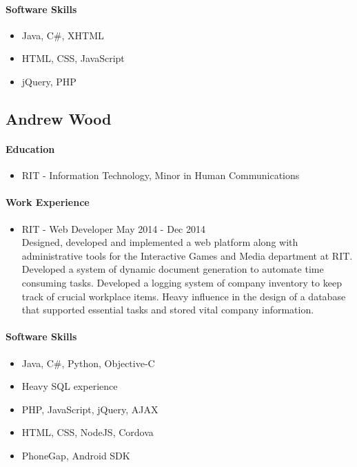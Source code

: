 	\paragraph{Software Skills}
	
		\begin{itemize}
			\item Java, C\#, XHTML
			\item HTML, CSS, JavaScript
			\item jQuery, PHP
		\end{itemize}

\subsection{Andrew Wood}
	\paragraph{Education}
		\begin{itemize}
			\item RIT - Information Technology, Minor in Human Communications
		\end{itemize}
	\paragraph{Work Experience}
		\begin{itemize}
			\item RIT - Web Developer \hfill May 2014 - Dec 2014\\
			Designed, developed and implemented a web platform along with administrative tools for the Interactive Games and Media department at RIT. Developed a system of dynamic document generation to automate time consuming tasks. Developed a logging system of company inventory to keep track of crucial workplace items. Heavy influence in the design of a database that supported essential tasks and stored vital company information.
		\end{itemize}
	\paragraph{Software Skills}
		\begin{itemize}
			\item Java, C\#, Python, Objective-C
			\item Heavy SQL experience
			\item PHP, JavaScript, jQuery, AJAX
			\item HTML, CSS, NodeJS, Cordova
			\item PhoneGap, Android SDK 
		\end{itemize}
	
